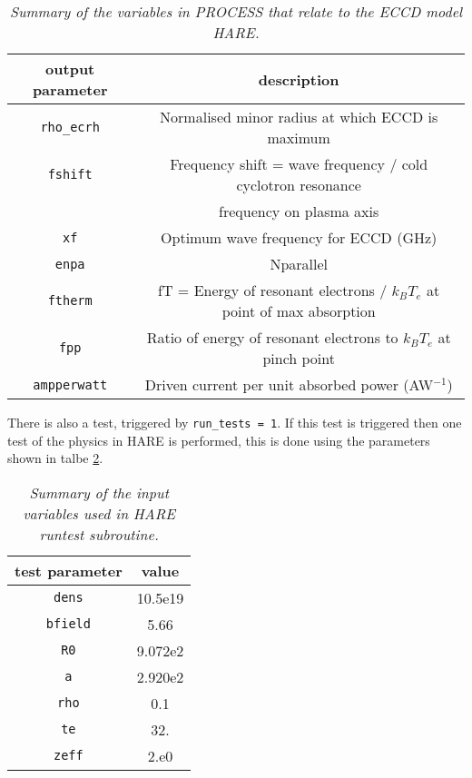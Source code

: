 \documentclass[11pt,a4paper]{report}
\begin{document}
\begin{table}[tbph]
\begin{center}
\begin{tabular}{||c|c||} \hline
output parameter & description \\ \hline
\texttt{rho\_ecrh} &  Normalised minor radius at which ECCD is maximum  \\
\texttt{fshift}  & Frequency shift = wave frequency / cold cyclotron resonance \\
 &  frequency on plasma axis \\
\texttt{xf} & Optimum wave frequency for ECCD (GHz)  \\
\texttt{enpa} &Nparallel \\
\texttt{ftherm} & fT = Energy of resonant electrons / $k_BT_e$ at point of max absorption  \\
\texttt{fpp} &  Ratio of energy of resonant electrons to $k_BT_e$ at pinch  point \\
\texttt{ampperwatt} & Driven current per unit absorbed power (AW$^{-1}$)  \\
\hline
\end{tabular}
\end{center}
\caption[Output parameters produced by HARE]
{\label{tab:ECCD}
  \textit{Summary of the variables in PROCESS that relate to
    the ECCD model HARE.}
}
\end{table}

There is also a test, triggered by \texttt{run\_tests = 1}. If this test is triggered then one test of the physics in HARE is performed, this is done using the parameters shown in talbe \ref{tab:testpara}.

\begin{table}[tbph]
\begin{center}
\begin{tabular}{||c|c||} \hline
test parameter & value \\ \hline
\texttt{dens} &  10.5e19  \\
\texttt{bfield}  & 5.66 \\
\texttt{R0} & 9.072e2 \\
\texttt{a} & 2.920e2 \\
\texttt{rho} & 0.1 \\
\texttt{te} &  32. \\
\texttt{zeff} & 2.e0  \\
\hline
\end{tabular}
\end{center}
\caption[Input parameters used by HARE test]
{\label{tab:testpara}
  \textit{Summary of the input variables used in HARE runtest subroutine.}
}
\end{table}
\end{document}
